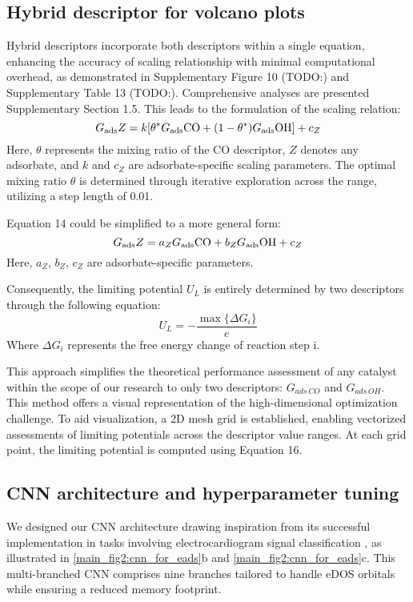 \subsection{Hybrid descriptor for volcano plots}
Hybrid descriptors incorporate both descriptors within a single equation, enhancing the accuracy of scaling relationship with minimal computational overhead, as demonstrated in Supplementary Figure 10 (TODO:) and Supplementary Table 13 (TODO:).
Comprehensive analyses are presented Supplementary Section 1.5. This leads to the formulation of the scaling relation:
\begin{equation*}
G_{\text{ads}} Z = k[\theta^* G_{\text{ads}} \ce{CO} + (1-\theta^*) G_{\text{ads}} \ce{OH}] + c_Z
\end{equation*}
Here, $\theta$ represents the mixing ratio of the CO descriptor, $\textit{Z}$ denotes any adsorbate, and $\textit{k}$ and $\textit{c}_{Z}$ are adsorbate-specific scaling parameters.
The optimal mixing ratio $\theta$ is determined through iterative exploration across the range, utilizing a step length of 0.01.

Equation 14 could be simplified to a more general form:
\begin{equation*}
G_{\text{ads}} Z = a_Z G_{\text{ads}} \ce{CO} + b_Z G_{\text{ads}} \ce{OH} + c_Z
\end{equation*}
Here, $a_Z$, $b_Z$, $c_Z$ are adsorbate-specific parameters.

Consequently, the limiting potential $\textit{U}_{L}$ is entirely determined by two descriptors through the following equation:
\begin{equation*}
U_L = -\frac{\max\{ \Delta G_i \}}{e}
\end{equation*}
Where $\Delta G_{i}$ represents the free energy change of reaction step i.

This approach simplifies the theoretical performance assessment of any catalyst within the scope of our research to only two descriptors: $G_{\textit{ads} \, \textit{CO}}$ and $G_{\textit{ads} \, \textit{OH}}$.
This method offers a visual representation of the high-dimensional optimization challenge.
To aid visualization, a 2D mesh grid is established, enabling vectorized assessments of limiting potentials across the descriptor value ranges.
At each grid point, the limiting potential is computed using Equation 16.


\subsection{CNN architecture and hyperparameter tuning}
We designed our CNN architecture drawing inspiration from its successful implementation in tasks involving electrocardiogram signal classification \cite{weimann2021transfer}, as illustrated in \cref{main_fig2:cnn_for_eads}b and \cref{main_fig2:cnn_for_eads}c.
This multi-branched CNN comprises nine branches tailored to handle eDOS orbitals while ensuring a reduced memory footprint.

